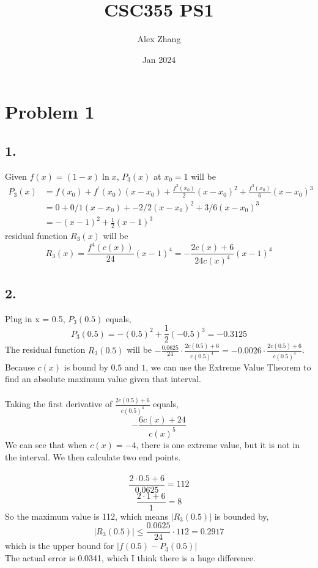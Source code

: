 \documentclass{article}
\title{CSC355 PS1}
\author{Alex Zhang}
\date{Jan 2024}
\begin{document}
\maketitle

\section{Problem 1}
\subsection*{1.}
Given $f(x) = (1-x) \ln x$, $P_3(x)$ at $x_0 = 1$ will be
\begin{align}
    P_3(x) &= f(x_0) + f^\prime (x_0)(x-x_0) + \frac{f^2(x_0)}{2}(x-x_0)^2 + \frac{f^3(x_0)}{6}(x-x_0)^3 \nonumber \\
    &= 0 + 0/1(x-x_0) + -2/2(x-x_0)^2 + 3/6(x-x_0)^3 \nonumber \\ 
    &= -(x-1)^2 + \frac{1}{2}(x-1)^3 \nonumber
\end{align}
residual function $R_3(x)$ will be 
$$R_3(x) = \frac{f^4(c(x))}{24}(x-1)^4 = -\frac{2c(x) + 6}{24c(x)^4}(x-1)^4$$


\subsection*{2.}
Plug in x = 0.5, $P_3(0.5)$ equals,
$$P_3(0.5) = -(0.5)^2 + \frac{1}{2}(-0.5)^3 = - 0.3125$$
The residual function $R_3(0.5)$ will be $-\frac{0.0625}{24} \cdot \frac{2c(0.5) + 6}{c(0.5)^4} = -0.0026 \cdot \frac{2c(0.5) + 6}{c(0.5)^4}$.
Because $c(x)$ is bound by $0.5$ and $1$, we can use the Extreme Value Theorem to find an absolute maximum value given that interval.
\\
\\
Taking the first derivative of $\frac{2c(0.5) + 6}{c(0.5)^4}$ equals,
$$-\frac{6c(x)+24}{c(x)^5}$$
We can see that when $c(x) = -4$, there is one extreme value, but it is not in the interval.
We then calculate two end points.
\\
\\
$$\frac{2\cdot 0.5 + 6}{0.0625} = 112$$
$$\frac{2\cdot 1 + 6}{1} = 8$$
So the maximum value is 112, which means $|R_3(0.5)|$ is bounded by,
$$|R_3(0.5)| \leq \frac{0.0625}{24} \cdot 112 = 0.2917$$
which is the upper bound for $|f(0.5) - P_3(0.5)|$
\\
The actual error is 0.0341, which I think there is a huge difference.
\end{document}
